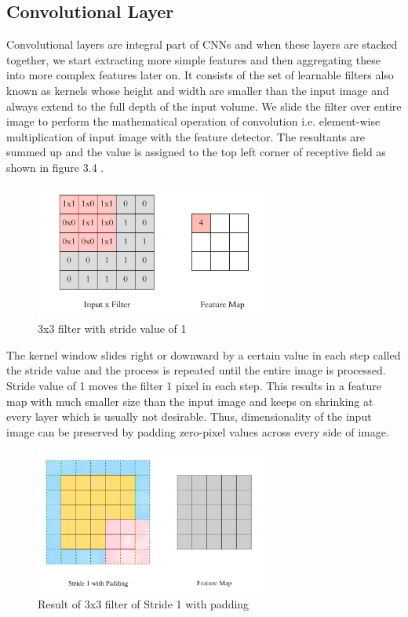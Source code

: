 \subsection{Convolutional Layer}
Convolutional layers are integral part of CNNs and when these layers are stacked
 together, we start extracting more simple 
features and then aggregating these into more complex features later 
on. It consists of the set of learnable filters also known as kernels whose
height and width are smaller than the input image and always extend 
to the full depth of the input volume. We slide the filter over entire 
image to perform the mathematical operation of convolution i.e. element-wise 
multiplication of input image with the feature detector. The resultants are 
summed up and the value is assigned to the top left corner of receptive field 
as shown in figure 3.4 \cite{chap_3_article:4}.

\begin{figure}[H]
	\centering
		\includegraphics[width=0.70\textwidth]{CHAPTERS/Chapter-3/Images/3.4}
	\caption{3x3 filter with stride value of 1}
	\label{fig:3.4}
\end{figure}

The kernel window slides right or downward by a 
certain value in each step called the stride value and 
the process is repeated until the entire image is processed. Stride value of
1 moves the filter 1 pixel in each step. This results in a feature map with 
much smaller size than the input image and keeps on shrinking at every layer 
which is usually not desirable. Thus, dimensionality of the input image can be 
preserved by padding zero-pixel values across every side of image.

\begin{figure}[H]
	\centering
		\includegraphics[width=0.70\textwidth]{CHAPTERS/Chapter-3/Images/3.5}
	\caption{Result  of 3x3 filter of Stride 1 with padding}
	\label{fig:3.5}
\end{figure}

